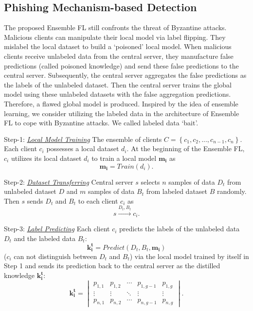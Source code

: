 \documentclass[journal]{IEEEtran}
\begin{document}
\subsection{Phishing Mechanism-based Detection}
The proposed Ensemble FL still confronts the threat of Byzantine attacks. Malicious clients can manipulate their local model via label flipping. They mislabel the local dataset to build a `poisoned' local model. When malicious clients receive unlabeled data from the central server, they manufacture false predictions (called poisoned knowledge) and send these false predictions to the central server. Subsequently, the central server aggregates the false predictions as the labels of the unlabeled dataset. Then the central server trains the global model using these unlabeled datasets with the false aggregation predictions. Therefore, a flawed global model is produced. Inspired by the idea of ensemble learning, we consider utilizing the labeled data in the architecture of Ensemble FL to cope with Byzantine attacks. We called labeled data `bait'.
  \par Step-1: \ul{\textit{Local Model Training}} The ensemble of clients $C=\left \{ c_{1},c_{2},...,c_{n-1},c_{n} \right \}$. Each client $c_i$ possesses a local dataset $d_i$. At the beginning of the Ensemble FL, $c_{i}$ utilizes its local dataset $d_i$ to train a local model $\mathbf{m_i}$ as
  \begin{equation}
    \mathbf{m_i}=Train(d_i).
  \end{equation}
  \par Step-2: \ul{\textit{Dataset Transferring}} Central server $s$ selects $n$ samples of data $D_t$ from unlabeled dataset $D$ and $m$ samples of data $B_t$ from labeled dataset $B$ randomly. Then $s$ sends $D_t$ and $B_t$ to each client $c_i$ as
  \begin{equation}
    s \overset{{D_{t},B_{t}}}{\rightarrow} c_{i}.
  \end{equation}
  \par Step-3: \ul{\textit{Label Predicting}} Each client $c_i$ predicts the labels of the unlabeled data $D_t$ and the labeled data $B_t$:
  \begin{equation}
    \mathbf{k_i^t}=Predict(D_t, B_t, \mathbf{m_i})
  \end{equation}
  ($c_i$ can not distinguish between $D_t$ and $B_t$) via the local model trained by itself in Step 1  and sends its prediction back to the central server as the distilled knowledge $\mathbf{k_i^t}$:
  \begin{equation}
    \mathbf{k_i^t}=\begin{vmatrix}
      p_{1,1} & p_{1,2} & \cdots  & p_{1,g-1} & p_{1,g}\\ 
      \vdots  & \vdots & \ddots  & \vdots & \vdots\\ 
      p_{n,1} & p_{n,2} & \cdots  & p_{n,g-1} & p_{n,g}
      \end{vmatrix}.
  \end{equation}
\end{document}

